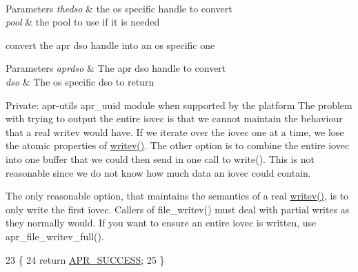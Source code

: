 $$\begin{DoxyParams}{Parameters}
\hline
{\em thedso} & the os specific handle to convert \\
\hline
{\em pool} & the pool to use if it is needed\\
\hline
\end{DoxyParams}
convert the apr dso handle into an os specific one 
\begin{DoxyParams}{Parameters}
{\em aprdso} & The apr dso handle to convert \\
\hline
{\em dso} & The os specific dso to return\\
\hline
\end{DoxyParams}
Private\+: apr-\/util\textquotesingle{}s apr\+\_\+uuid module when supported by the platform The problem with trying to output the entire iovec is that we cannot maintain the behaviour that a real writev would have. If we iterate over the iovec one at a time, we lose the atomic properties of \hyperlink{apr__arch__os2calls_8h_a3d0f3996136a9b5ab46431c60c746efd}{writev()}. The other option is to combine the entire iovec into one buffer that we could then send in one call to write(). This is not reasonable since we do not know how much data an iovec could contain.

The only reasonable option, that maintains the semantics of a real \hyperlink{apr__arch__os2calls_8h_a3d0f3996136a9b5ab46431c60c746efd}{writev()}, is to only write the first iovec. Callers of file\+\_\+writev() must deal with partial writes as they normally would. If you want to ensure an entire iovec is written, use apr\+\_\+file\+\_\+writev\+\_\+full().
\begin{DoxyCode}
23 \{
24     \textcolor{keywordflow}{return} \hyperlink{group__apr__errno_ga9ee311b7bf1c691dc521d721339ee2a6}{APR\_SUCCESS};
25 \}
\end{DoxyCode}
